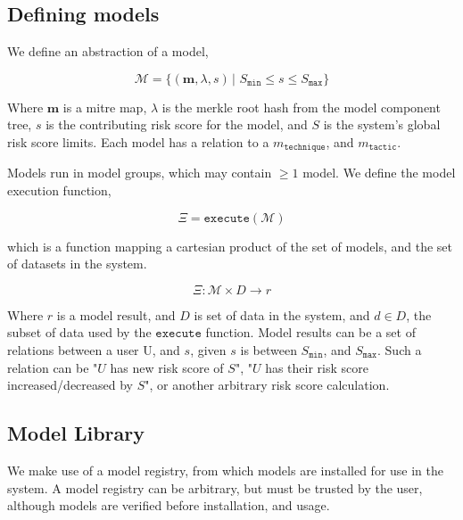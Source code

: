 \documentclass[10pt, titlepage, twocolumn]{report}
\begin{document}
\subsection{Defining models}
We define an abstraction of a model, 

\begin{equation}
\boldsymbol{\mathcal{M}} = \{(\boldsymbol{m}, \lambda, s) \, \vert \,\,S_{ \texttt{min} } \leq s \leq S_{ \texttt{max} }  \}
\end{equation}

Where \(\boldsymbol{m}\) is a mitre map, \(\lambda\) is the merkle root hash from the model component tree, \(s\) is the contributing risk score for the model, and \(S\) is the system's global risk score limits. Each model has a relation to a \(m_{\texttt{technique}}\), and \(m_{\texttt{tactic}}\). 


Models run in model groups, which may contain \(\geq 1\) model. We define the model execution function, 

\begin{equation}
\Xi = \texttt{execute}( \boldsymbol{\mathcal{M}} )
\end{equation}

which is a function mapping a cartesian product of the set of models, and the set of datasets in the system.

\begin{equation}
\Xi  :  \boldsymbol{\mathcal{M}} \times D \rightarrow r
\end{equation}

Where \(r\) is a model result, and \(D\) is set of data in the system, and \(d \in D\), the subset of data used by the \(\texttt{execute}\) function. Model results can be a set of relations between a user U, and \(s\), given \(s\) is between \(S_{ \texttt{min} }\), and \(S_{ \texttt{max} }\). Such a relation can be "\(U\) has new risk score of \(S\)", "\(U\) has their risk score increased/decreased by \(S\)", or another arbitrary risk score calculation. 





\subsection{Model Library}
We make use of a model registry, from which models are installed for use in the system. A model registry can be arbitrary, but must be trusted by the user, although models are verified before installation, and usage. 
\end{document}
